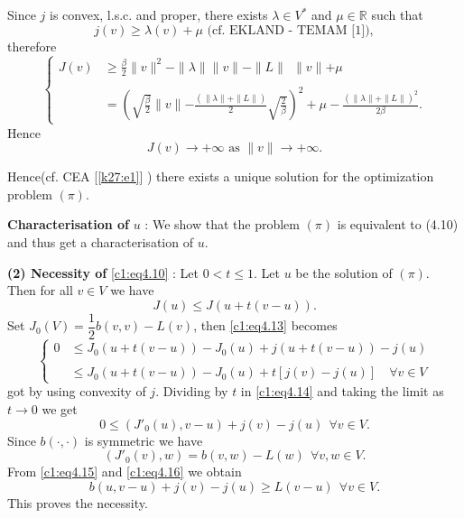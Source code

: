 Since $j$ is convex, l.s.c. and proper, there exists $\lambda \in
V^*$ and $\mu \in \mathbb{R}$ such that  
$$
j(v)\geq \lambda (v) +  \mu \text{ (cf. EKLAND - TEMAM [1])},
$$
therefore
\begin{equation}
\begin{cases}
J(v) & \geq \frac{\beta}{2} \parallel v \parallel^2 - \parallel
\lambda \parallel \parallel v\parallel -\parallel L \parallel
~~\parallel v\parallel + \mu\\ 
&\\
& =\left(\sqrt{\frac{\beta}{2}} \parallel v \parallel - \frac{(\parallel
  \lambda \parallel + \parallel L \parallel )}{2}
\sqrt{\frac{2}{\beta}}\right)^2 + \mu - \frac{(\parallel \lambda \parallel +
  \parallel L \parallel )^2}{2\beta}. 
\end{cases}\tag{4.11}\label{c1:eq4.11}
\end{equation}
Hence
\begin{equation}
J(v) \to + \infty \text{ as } \parallel  v \parallel  \to +
\infty. \tag{4.12}\label{c1:eq4.12} 
\end{equation}

Hence\pageoriginale (cf. CEA [\ref{k27:e1}] ) there exists a unique solution for the optimization problem $(\pi)$. 

\textbf{Characterisation of} $u$ : We show that the problem $(\pi)$ is
equivalent to (4.10) and thus get a characterisation of $u$. 

\textbf{(2) Necessity of} \eqref{c1:eq4.10} : Let $0 < t \leq 1$. Let $u$ be the
solution of $(\pi)$. Then for all $v \in V$ we have  
\begin{equation}
J(u) \leq J(u + t(v - u)). \tag{4.13}\label{c1:eq4.13}
\end{equation}
Set $J_0 (V) = \dfrac{1}{2} b(v, v) - L(v)$, then \eqref{c1:eq4.13} becomes
\begin{equation}
\begin{cases}
0 & \leq J_0 (u + t(v - u)) - J_0(u) + j(u + t(v - u)) - j(u)\\
&\\
& \leq J_0 (u + t(v - u)) - J_0(u) + t[j(v) - j(u)]\quad\forall v \in V
\end{cases}\tag{4.14}\label{c1:eq4.14}
\end{equation}
got by using convexity of $j$. Dividing by $t$ in \eqref{c1:eq4.14} and taking
the limit as $t \to 0$ we get  
\begin{equation}
0 \leq (J'_0(u), v - u) + j(v) - j(u) ~~\forall v \in
V. \tag{4.15}\label{c1:eq4.15} 
\end{equation}
Since $b(\cdot , \cdot)$ is symmetric we have 
\begin{equation}
(J'_0(v), w) = b(v, w) - L(w) ~~\forall v, w \in
  V. \tag{4.16}\label{c1:eq4.16}
\end{equation}
From \eqref{c1:eq4.15} and \ref{c1:eq4.16} we obtain 
$$
b(u, v - u) + j(v) - j(u ) \geq L(v - u) ~~\forall v \in V.
$$
This proves the necessity. 

